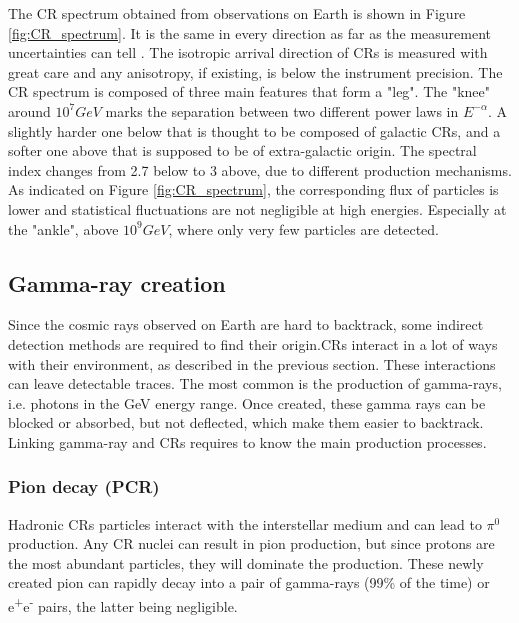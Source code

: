 The CR spectrum obtained from observations on Earth is shown in Figure \ref{fig:CR_spectrum}. It is the same in every direction as far as the measurement uncertainties can tell . The isotropic arrival direction of CRs is measured with great care and any anisotropy, if existing, is below the instrument precision.
The CR spectrum is composed of three main features that form a "leg". The "knee" around $10^{7} GeV$ marks the separation between two different power laws in $E^{-\alpha}$. A slightly harder one below that is thought to be composed of galactic CRs, and a softer one above that is supposed to be of extra-galactic origin. The spectral index changes from 2.7 below to 3 above, due to different production mechanisms. 
As indicated on Figure \ref{fig:CR_spectrum}, the corresponding flux of particles is lower and statistical fluctuations are not negligible at high energies. Especially at the "ankle", above $10^9 GeV$, where only very few particles are detected.


\subsection{Gamma-ray creation}

Since the cosmic rays observed on Earth are hard to backtrack, some indirect detection methods are required to find their origin.CRs interact in a lot of ways with their environment, as described in the previous section. These interactions can leave detectable traces. The most common is the production of gamma-rays, i.e. photons in the GeV energy range. Once created, these gamma rays can be blocked or absorbed, but not deflected, which make them easier to backtrack. Linking gamma-ray and CRs requires to know the main production processes.

\subsubsection{Pion decay (PCR)}


Hadronic CRs  particles interact with the interstellar medium and can lead to $\pi^0$ production. Any CR nuclei can result in pion production, but since protons are the most abundant particles, they will dominate the production. 
These newly created pion can rapidly decay into a pair of gamma-rays (99\% of the time) or e\textsuperscript{+}e\textsuperscript{-} pairs, the latter being negligible.




